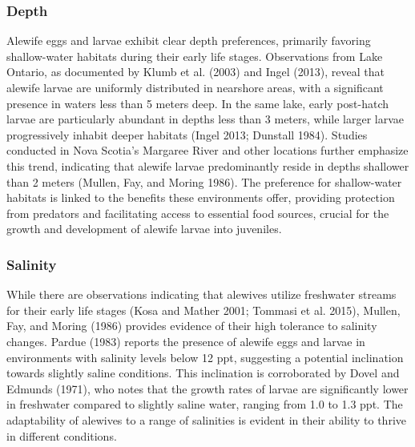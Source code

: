 \documentclass[
]{book}
\begin{document}
\hypertarget{depth-2}{%
\subsubsection{Depth}\label{depth-2}}

Alewife eggs and larvae exhibit clear depth preferences, primarily favoring shallow-water habitats during their early life stages. Observations from Lake Ontario, as documented by Klumb et al. (2003) and Ingel (2013), reveal that alewife larvae are uniformly distributed in nearshore areas, with a significant presence in waters less than 5 meters deep. In the same lake, early post-hatch larvae are particularly abundant in depths less than 3 meters, while larger larvae progressively inhabit deeper habitats (Ingel 2013; Dunstall 1984). Studies conducted in Nova Scotia's Margaree River and other locations further emphasize this trend, indicating that alewife larvae predominantly reside in depths shallower than 2 meters (Mullen, Fay, and Moring 1986). The preference for shallow-water habitats is linked to the benefits these environments offer, providing protection from predators and facilitating access to essential food sources, crucial for the growth and development of alewife larvae into juveniles.

\hypertarget{salinity-2}{%
\subsubsection{Salinity}\label{salinity-2}}

While there are observations indicating that alewives utilize freshwater streams for their early life stages (Kosa and Mather 2001; Tommasi et al. 2015), Mullen, Fay, and Moring (1986) provides evidence of their high tolerance to salinity changes. Pardue (1983) reports the presence of alewife eggs and larvae in environments with salinity levels below 12 ppt, suggesting a potential inclination towards slightly saline conditions. This inclination is corroborated by Dovel and Edmunds (1971), who notes that the growth rates of larvae are significantly lower in freshwater compared to slightly saline water, ranging from 1.0 to 1.3 ppt. The adaptability of alewives to a range of salinities is evident in their ability to thrive in different conditions.
\end{document}
